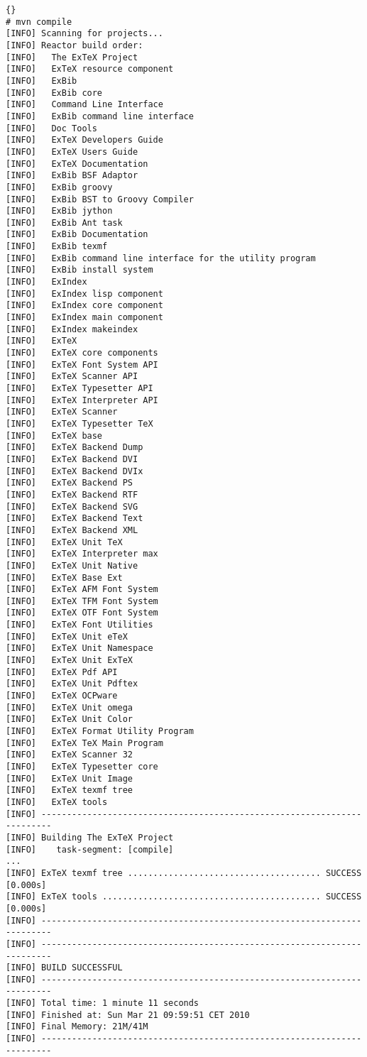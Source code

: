 \begin{lstlisting}{}
# mvn compile
[INFO] Scanning for projects...
[INFO] Reactor build order: 
[INFO]   The ExTeX Project
[INFO]   ExTeX resource component
[INFO]   ExBib
[INFO]   ExBib core
[INFO]   Command Line Interface
[INFO]   ExBib command line interface
[INFO]   Doc Tools
[INFO]   ExTeX Developers Guide
[INFO]   ExTeX Users Guide
[INFO]   ExTeX Documentation
[INFO]   ExBib BSF Adaptor
[INFO]   ExBib groovy
[INFO]   ExBib BST to Groovy Compiler
[INFO]   ExBib jython
[INFO]   ExBib Ant task
[INFO]   ExBib Documentation
[INFO]   ExBib texmf
[INFO]   ExBib command line interface for the utility program
[INFO]   ExBib install system
[INFO]   ExIndex
[INFO]   ExIndex lisp component
[INFO]   ExIndex core component
[INFO]   ExIndex main component
[INFO]   ExIndex makeindex
[INFO]   ExTeX
[INFO]   ExTeX core components
[INFO]   ExTeX Font System API
[INFO]   ExTeX Scanner API
[INFO]   ExTeX Typesetter API
[INFO]   ExTeX Interpreter API
[INFO]   ExTeX Scanner
[INFO]   ExTeX Typesetter TeX
[INFO]   ExTeX base
[INFO]   ExTeX Backend Dump
[INFO]   ExTeX Backend DVI
[INFO]   ExTeX Backend DVIx
[INFO]   ExTeX Backend PS
[INFO]   ExTeX Backend RTF
[INFO]   ExTeX Backend SVG
[INFO]   ExTeX Backend Text
[INFO]   ExTeX Backend XML
[INFO]   ExTeX Unit TeX
[INFO]   ExTeX Interpreter max
[INFO]   ExTeX Unit Native
[INFO]   ExTeX Base Ext
[INFO]   ExTeX AFM Font System
[INFO]   ExTeX TFM Font System
[INFO]   ExTeX OTF Font System
[INFO]   ExTeX Font Utilities
[INFO]   ExTeX Unit eTeX
[INFO]   ExTeX Unit Namespace
[INFO]   ExTeX Unit ExTeX
[INFO]   ExTeX Pdf API
[INFO]   ExTeX Unit Pdftex
[INFO]   ExTeX OCPware
[INFO]   ExTeX Unit omega
[INFO]   ExTeX Unit Color
[INFO]   ExTeX Format Utility Program
[INFO]   ExTeX TeX Main Program
[INFO]   ExTeX Scanner 32
[INFO]   ExTeX Typesetter core
[INFO]   ExTeX Unit Image
[INFO]   ExTeX texmf tree
[INFO]   ExTeX tools
[INFO] ------------------------------------------------------------------------
[INFO] Building The ExTeX Project
[INFO]    task-segment: [compile]
...
[INFO] ExTeX texmf tree ...................................... SUCCESS [0.000s]
[INFO] ExTeX tools ........................................... SUCCESS [0.000s]
[INFO] ------------------------------------------------------------------------
[INFO] ------------------------------------------------------------------------
[INFO] BUILD SUCCESSFUL
[INFO] ------------------------------------------------------------------------
[INFO] Total time: 1 minute 11 seconds
[INFO] Finished at: Sun Mar 21 09:59:51 CET 2010
[INFO] Final Memory: 21M/41M
[INFO] ------------------------------------------------------------------------
\end{lstlisting}


